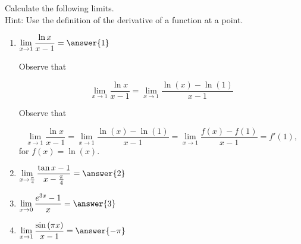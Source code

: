 \documentclass{ximera}
\author{Nela Lakos}
\begin{document}
\begin{exercise}

Calculate the following limits.\\
Hint: Use the definition of the derivative of a function at a point. 
\begin{enumerate}
\item  $\displaystyle \lim_{x \to 1} \dfrac{\ln{x}}{x-1} =\answer{1}$\\
\begin{hint}
Observe that 

\[
\displaystyle \lim_{x \to 1} \dfrac{\ln{x}}{x-1}=\displaystyle \lim_{x \to 1} \dfrac{\ln{(x)}-\ln{(1)}}{x-1}
\]
\end{hint}
\begin{hint}
Observe that 

\[
\displaystyle \lim_{x \to 1} \dfrac{\ln{x}}{x-1}=\displaystyle \lim_{x \to 1} \dfrac{\ln{(x)}-\ln{(1)}}{x-1}=\displaystyle \lim_{x \to 1} \dfrac{f{(x)}-f{(1)}}{x-1}=f'(1),
\]
for $f(x)=\ln(x)$.
\end{hint}
\item$\displaystyle \lim_{x \to \frac{\pi}{4}} \dfrac{\tan{x}-1}{x-\frac{\pi}{4}} =\answer{2}$\\
\item$\displaystyle \lim_{x \to 0} \dfrac{e^{3x}-1}{x} =\answer{3}$\\
\item$\displaystyle \lim_{x \to 1} \dfrac{\sin{(\pi x)}}{x-1} =\answer{-\pi}$\\
\end{enumerate}
\end{exercise}
\end{document}
